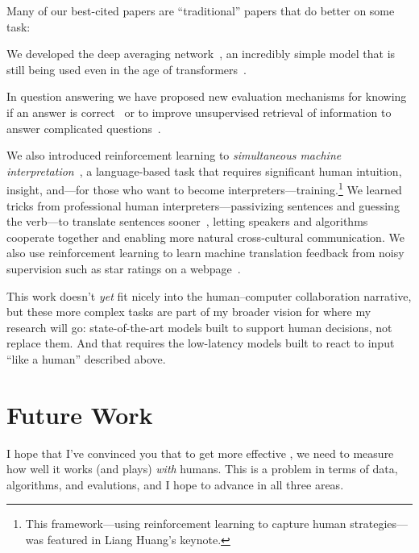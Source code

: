 Many of our best-cited papers are ``traditional'' papers that do
better on some task:
%
\begin{itemize*}
\item We developed the deep averaging network~\cite[]{iyyer-15}, an
incredibly simple model that is still being used even in the age of
transformers~\cite{ye-22}.

\item In question answering we have proposed new evaluation mechanisms
  for knowing if an answer is correct~\cite{si-21} or to improve
  unsupervised retrieval of information to answer complicated
  questions~\cite{elgohary-19,zhao-20,shi-20}.

\item We also introduced reinforcement learning to \emph{simultaneous
machine interpretation}~\cite{Grissom:He:Boyd-Graber:Morgan-2014}, a
  language-based task that requires significant human intuition,
  insight, and---for those who want to become
  interpreters---training.\footnote{This framework---using
  reinforcement learning to capture human strategies---was featured in
  Liang Huang's  keynote.} We learned tricks from
  professional human interpreters---passivizing sentences and guessing
  the verb---to translate sentences sooner~\cite{He-15}, letting
  speakers and algorithms cooperate together and enabling more natural
  cross-cultural communication.  We also use reinforcement
  learning to learn machine translation feedback from noisy
  supervision such as star ratings on a webpage~\cite{nguyen-17}.
\end{itemize*}

This work doesn't \emph{yet} fit nicely into the human--computer
collaboration narrative, but these more complex tasks are part of my
broader vision for where my research will go: state-of-the-art models
built to support human decisions, not replace them.  And that requires
the low-latency models built to react to input ``like a human''
described above.

\section{Future Work}

I hope that I've convinced you that to get more effective , we
need to measure how well it works (and plays) \emph{with} humans.
%
This is a problem in terms of data, algorithms, and evalutions, and I
hope to advance in all three areas.

